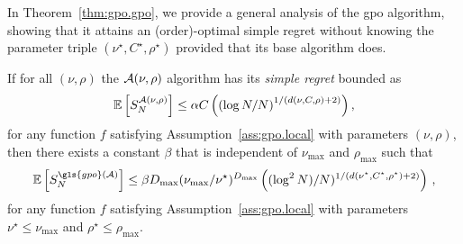 In Theorem~\ref{thm:gpo.gpo}, we provide a general analysis of the \gls{gpo} algorithm, showing that it attains an (order)-optimal simple regret without knowing the parameter triple $(\nu^\star,C^\star,\rho^\star)$ provided that its base algorithm does.

\begin{theorem}\label{thm:gpo.gpo}
\begin{leftbar}[theorembar]
If for all $(\nu,\rho)$ the $\mathcal{A}(\nu,\rho)$ algorithm has its \emph{simple regret} bounded as
\begin{equation}\label{crucialHypothesis}
    \mathbb{E}\left[S_N^{\mathcal{A}(\nu,\rho)}\right] \leq \alpha C\left(\left(\log N /N\right)^{1/(d(\nu,C,\rho)+2)}\right),
\end{equation}
for any function $f$ satisfying Assumption~\ref{ass:gpo.local} with parameters $(\nu,\rho)$, then there exists a constant $\beta$ that is independent of $\nu_{\max}$ and $\rho_{\max}$ such that 
\[
    \mathbb{E}\left[S_N^{\gls{gpo}(\cA)}\right]  \leq \beta D_{\max}(\nu_{\max}/\nu^\star)^{D_{\max}} \left( (\log^2 N)/N)^{1/(d(\nu^\star,C^\star,\rho^\star)+2)} \right)\,,
\]
for any function $f$ satisfying Assumption~\ref{ass:gpo.local} with parameters $\nu^\star \leq \nu_{\max}$ and $\rho^\star\leq \rho_{\max}$.
\end{leftbar}
\end{theorem}

